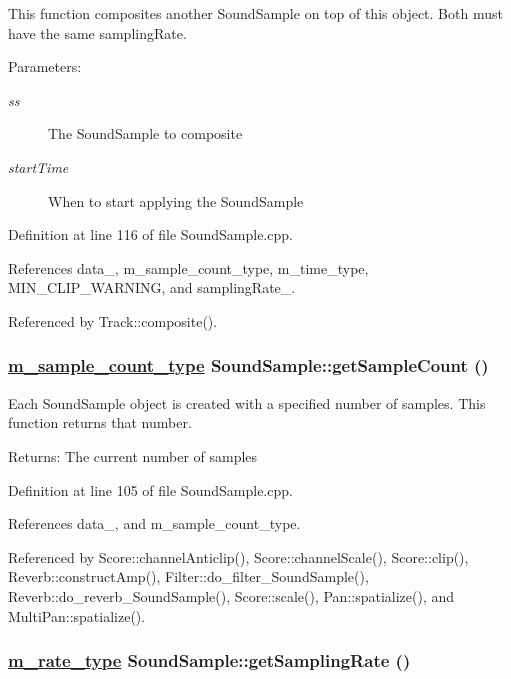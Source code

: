 This function composites another Sound\-Sample on top of this object. Both must have the same sampling\-Rate. \begin{Desc}
\item[Parameters:]
\begin{description}
\item[{\em ss}]The Sound\-Sample to composite \item[{\em start\-Time}]When to start applying the Sound\-Sample \end{description}
\end{Desc}


Definition at line 116 of file Sound\-Sample.cpp.

References data\_\-, m\_\-sample\_\-count\_\-type, m\_\-time\_\-type, MIN\_\-CLIP\_\-WARNING, and sampling\-Rate\_\-.

Referenced by Track::composite().\hypertarget{classSoundSample_a6}{
\subsubsection[getSampleCount]{\setlength{\rightskip}{0pt plus 5cm}\hyperlink{Types_8h_a1}{m\_\-sample\_\-count\_\-type} Sound\-Sample::get\-Sample\-Count ()}}
\label{classSoundSample_a6}


Each Sound\-Sample object is created with a specified number of samples. This function returns that number. \begin{Desc}
\item[Returns:]The current number of samples \end{Desc}


Definition at line 105 of file Sound\-Sample.cpp.

References data\_\-, and m\_\-sample\_\-count\_\-type.

Referenced by Score::channel\-Anticlip(), Score::channel\-Scale(), Score::clip(), Reverb::construct\-Amp(), Filter::do\_\-filter\_\-Sound\-Sample(), Reverb::do\_\-reverb\_\-Sound\-Sample(), Score::scale(), Pan::spatialize(), and Multi\-Pan::spatialize().\hypertarget{classSoundSample_a5}{
\subsubsection[getSamplingRate]{\setlength{\rightskip}{0pt plus 5cm}\hyperlink{Types_8h_a4}{m\_\-rate\_\-type} Sound\-Sample::get\-Sampling\-Rate ()}}
\label{classSoundSample_a5}


